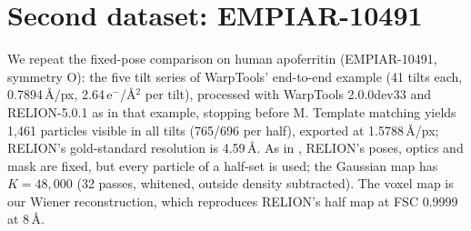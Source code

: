 \section{Second dataset: EMPIAR-10491}
\label{sec:suppl:dataset2}

We repeat the fixed-pose comparison on human apoferritin (EMPIAR-10491, symmetry O): the five tilt series of WarpTools' end-to-end example (41 tilts each, 0.7894\,\AA/px, 2.64\,e$^-$/\AA$^2$ per tilt), processed with WarpTools 2.0.0dev33 and RELION-5.0.1 as in that example, stopping before M.
Template matching yields 1,461 particles visible in all tilts (765/696 per half), exported at 1.5788\,\AA/px; RELION's gold-standard resolution is 4.59\,\AA.
As in , RELION's poses, optics and mask are fixed, but every particle of a half-set is used; the Gaussian map has $K{=}48{,}000$ (32 passes, whitened, outside density subtracted).
The voxel map is our Wiener reconstruction, which reproduces RELION's half map at FSC 0.9999 at 8\,\AA.

